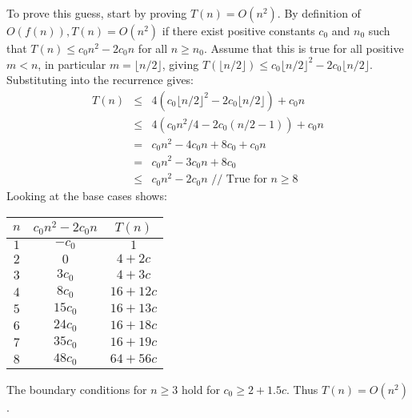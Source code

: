 To prove this guess, start by proving $T(n) = O(n^2)$.  By definition of $O(f(n)), T(n) = O(n^2)$ if there exist positive constants $c_0$ and $n_0$ such that $T(n) \leq c_0 n^2 - 2c_0n$ for all $n \geq n_0$.  Assume that this is true for all positive $m<n$, in particular $m=\lfloor n/2 \rfloor$, giving $T(\lfloor n/2 \rfloor) \leq c_0 \lfloor n/2 \rfloor^2 - 2c_0 \lfloor n/2 \rfloor$.  Substituting into the recurrence gives:
\begin{eqnarray*}
	T(n) & \leq & 4(c_0 \lfloor n/2 \rfloor^2 - 2c_0 \lfloor n/2 \rfloor) + c_0n \\
	 & \leq & 4(c_0n^2/4 - 2c_0(n/2 - 1)) + c_0 n \\
	 & = & c_0n^2 - 4c_0n + 8c_0 + c_0n \\
	 & = & c_0n^2 - 3c_0n + 8c_0 \\
	 & \leq & c_0n^2 - 2c_0n \text{~// True for $n \geq 8$}
\end{eqnarray*}
Looking at the base cases shows:
\begin{center}
\begin{tabular}{c|c|c}
	$n$ & $c_0n^2 - 2c_0n$ & $T(n)$ \\ \hline
	$1$ & $-c_0$ & $1$ \\
	$2$ & $0$ & $4 + 2c$ \\
	$3$ & $3c_0$ & $4 + 3c$ \\
	$4$ & $8c_0$ & $16 + 12c$ \\
	$5$ & $15c_0$ & $16 + 13c$ \\
	$6$ & $24c_0$ & $16 + 18c$ \\
	$7$ & $35c_0$ & $16 + 19c$ \\
	$8$ & $48c_0$ & $64 + 56c$
\end{tabular}
\end{center}
The boundary conditions for $n \geq 3$ hold for $c_0 \geq 2 + 1.5c$.  Thus $T(n) = O(n^2)$.

